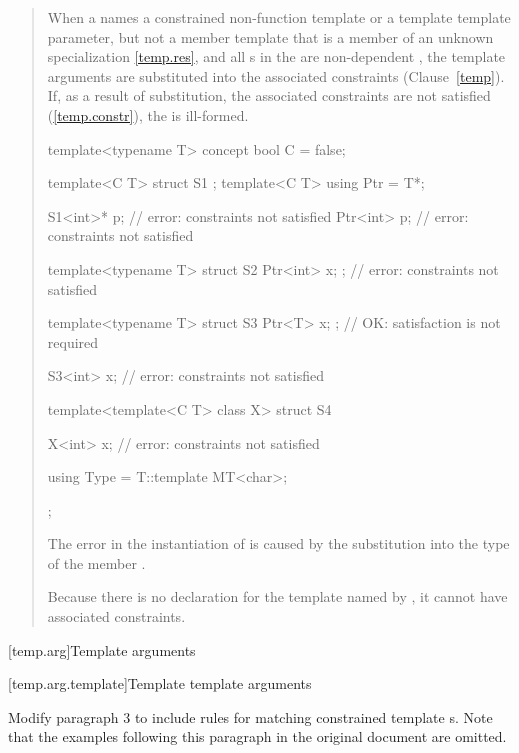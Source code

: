 \begin{quote}
\setcounter{Paras}{7}
\pnum
When a  names
a constrained non-function template or a template template parameter,
but not a member template that is a member of an unknown specialization
\ref{temp.res}, and all s in the
 are non-dependent , the template
arguments are substituted into the associated constraints
(Clause~\ref{temp}). 
% 
If, as a result of substitution, the associated constraints are not 
satisfied (\ref{temp.constr}), the  is ill-formed.
% 
\enterexample
\begin{codeblock}
template<typename T> concept bool C = false;

template<C T> struct S1 { };
template<C T> using Ptr = T*;

S1<int>* p; // error: constraints not satisfied
Ptr<int> p; // error: constraints not satisfied

template<typename T>
  struct S2 { Ptr<int> x; }; // error: constraints not satisfied

template<typename T>
  struct S3 { Ptr<T> x; };   // OK: satisfaction is not required

S3<int> x;                   // error: constraints not satisfied

template<template<C T> class X>
  struct S4 {
    X<int> x; // error: constraints not satisfied

    using Type = T::template MT<char>;
  };
\end{codeblock}
The error in the instantiation of  is caused
by the substitution into the type of the member .

Because there is no declaration for the template named by 
, it cannot have associated
constraints.
\exitexample
\end{quote}


[temp.arg]{Template arguments}

[temp.arg.template]{Template template arguments}

Modify paragraph 3 to include rules for matching constrained template 
s. Note that the examples following this 
paragraph in the original document are omitted.

